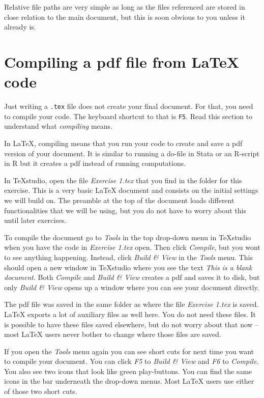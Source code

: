 \documentclass[12pts]{article}
\begin{document}
	Relative file paths are very simple as long as the files referenced are stored in close relation to the main document, but this is soon obvious to you unless it already is.
	
	\section{Compiling a pdf file from  {\LaTeX} code}
	
	\begin{tcolorbox}[colback=white,colframe=orange,title=\textbf{Read first}]
		Just writing a \texttt{.tex} file does not create your final document. For that, you need to compile your code. The keyboard shortcut to that is \texttt{F5}. Read this section to understand what \textit{compiling} means.
	\end{tcolorbox}
	
	In {\LaTeX}, compiling means that you run your code to create and save a pdf version of your document. It is similar to running a do-file in Stata or an R-script in R but it creates a pdf instead of running computations. 
	
	In TeXstudio, open the file \emph{Exercise 1.tex} that you find in the folder for this exercise. This is a very basic {\LaTeX} document and consists on the initial settings we will build on. The preamble at the top of the document loads different functionalities that we will be using, but you do not have to worry about this until later exercises.
	
	To compile the document go to \emph{Tools} in the top drop-down menu in TeXstudio when you have the code in \emph{Exercise 1.tex} open. Then click \emph{Compile}, but you wont to see anything happening. Instead, click \emph{Build \& View} in the \emph{Tools} menu. This should open a new window in TeXstudio where you see the text \emph{This is a blank document}. Both \emph{Compile} and \emph{Build \& View} creates a pdf and saves it to disk, but only \emph{Build \& View} opens up a window where you can see your document directly. 
	
	The pdf file was saved in the same folder as where the file \emph{Exercise 1.tex} is saved. {\LaTeX} exports a lot of auxiliary files as well here. You do not need these files. It is possible to have these files saved elsewhere, but do not worry about that now -- most {\LaTeX} users never bother to change where those files are saved.
	
	If you open the \emph{Tools} menu again you can see short cuts for next time you want to compile your document. You can click \emph{F5} to \emph{Build \& View} and \emph{F6} to \emph{Compile}. You also see two icons that look like green play-buttons. You can find the same icons in the bar underneath the drop-down menus. Most {\LaTeX} users use either of those two short cuts.
	
\end{document}
